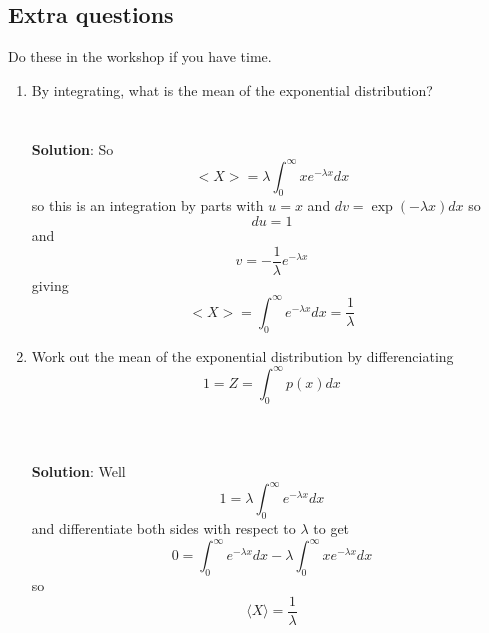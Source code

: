 \documentclass[11pt,a4paper]{scrartcl}
\begin{document}
\begin{enumerate}
\end{enumerate}

\subsection*{Extra questions}

Do these in the workshop if you have time.

\begin{enumerate}

\item By integrating, what is the mean of the exponential distribution?\\
  \\
  \\ \textbf{Solution}: So
  \begin{equation}
    <X>=\lambda\int_0^\infty xe^{-\lambda x}dx
  \end{equation}
  so this is an integration by parts with $u=x$ and $dv=\exp{(-\lambda x)}dx$ so
  \begin{equation}
    du=1
  \end{equation}
  and
  \begin{equation}
    v=-\frac{1}{\lambda}e^{-\lambda x}
  \end{equation}
  giving
    \begin{equation}
    <X>=\int_0^\infty e^{-\lambda x}dx=\frac{1}{\lambda}
  \end{equation}

\item Work out the mean of the exponential distribution by differenciating
  $$1=Z=\int_0^{\infty} p(x)dx$$
  \\ \\ \\ \textbf{Solution}: Well
  \begin{equation}
    1=\lambda\int_0^\infty e^{-\lambda x}dx
  \end{equation}
  and differentiate both sides with respect to $\lambda$ to get
  \begin{equation}
    0=\int_0^\infty e^{-\lambda x}dx-\lambda \int_0^\infty xe^{-\lambda x}dx
  \end{equation}
  so
  \begin{equation}
    \langle X\rangle=\frac{1}{\lambda}
  \end{equation}


\end{enumerate}
\end{document}
